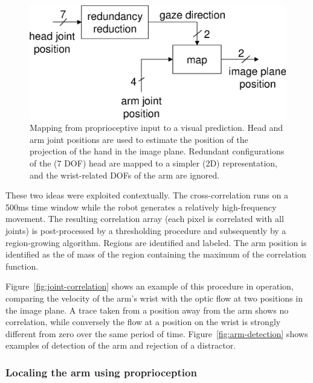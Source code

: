 \ifverbose
\begin{figure}[tb]
\begin{center}
\includegraphics[width=\columnwidth]{mapping-reach.eps}
\caption{ 
\label{fig:mapping-reach}
%
Mapping from proprioceptive input to a visual prediction. Head and arm
joint positions are used to estimate the position of the projection of
the hand in the image plane.  Redundant configurations of the (7 DOF)
head are mapped to a simpler (2D) representation, and the wrist-related 
DOFs of the arm are ignored.
%
}
\end{center}
\end{figure}
\fi

\ifverbose
These two ideas were exploited contextually. The cross-correlation
runs on a 500ms time window while the robot generates a relatively
high-frequency movement. The resulting correlation array (each pixel
is correlated with all joints) is post-processed by a thresholding
procedure and subsequently by a region-growing algorithm. Regions are
identified and labeled. The arm position is identified as the \ahhcenter{}
of mass of the region containing the maximum of the correlation
function.
\fi

Figure~\ref{fig:joint-correlation} shows an example of this procedure
in operation, comparing the velocity of the arm's wrist with the optic
flow at two positions in the image plane.  A trace taken from a
position away from the arm shows no correlation, while conversely the
flow at a position on the wrist is strongly different from zero over
the same period of time.  Figure~\ref{fig:arm-detection} shows
examples of detection of the arm and rejection of a distractor.


\subsubsection*{Local\iz{}ing the arm using proprioception}

